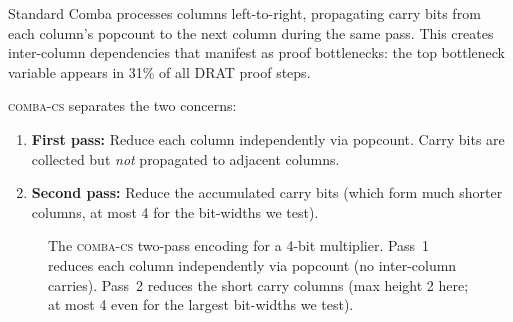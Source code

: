 \documentclass[a4paper]{ceurart}
\newcommand{\combacs}{\textsc{comba-cs}\xspace}
\begin{document}
Standard Comba processes columns left-to-right, propagating carry bits
from each column's popcount to the next column during the same pass.
This creates inter-column dependencies that manifest as proof
bottlenecks: the top bottleneck variable appears in 31\% of all DRAT
proof steps.

\combacs separates the two concerns:
\begin{enumerate}
\item \textbf{First pass:} Reduce each column independently via
  popcount. Carry bits are collected but \emph{not} propagated to
  adjacent columns.
\item \textbf{Second pass:} Reduce the accumulated carry bits (which
  form much shorter columns, at most 4 for the bit-widths we test).
\end{enumerate}

\begin{figure}[ht]
\centering
{}
\caption{The \combacs two-pass encoding for a 4-bit multiplier.
  Pass~1 reduces each column independently via popcount (no
  inter-column carries). Pass~2 reduces the short carry columns
  (max height 2 here; at most 4 even for the largest bit-widths
  we test).}
\label{fig:combacs}
\end{figure}
\end{document}
